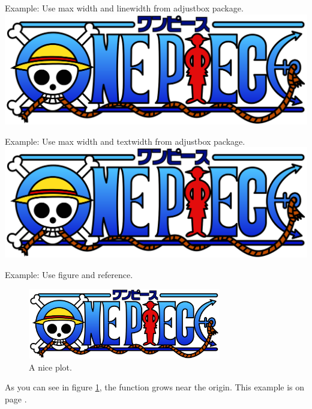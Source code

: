 \documentclass[letterpaper, oneside]{book}
\begin{document}
	Example: Use max width and linewidth from adjustbox package. \\
	\includegraphics[max width=\linewidth]{One_Piece_Logo.png}  
	
	Example: Use max width and textwidth from adjustbox package. \\
	\includegraphics[max width=\textwidth]{One_Piece_Logo.png}  
	
	Example: Use figure and reference.
	\begin{figure}[h]
		\centering
		\includegraphics[width=0.75\textwidth]{One_Piece_Logo.png}
		\caption{A nice plot.}
		\label{fig:mesh1}
	\end{figure}
	
	As you can see in figure \ref{fig:mesh1}, the function grows near the origin. This example is on page \pageref{fig:mesh1}.
	
	


		
	
	
	
	
	
	
\end{document}
